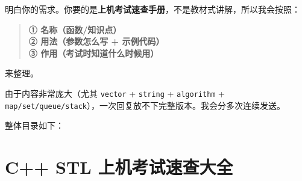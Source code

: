 \documentclass[9pt,twocolumn]{extarticle}
\begin{document}
\setcounter{page}{1}  %
\setcounter{tocdepth}{2} %

\tableofcontents %

\clearpage %

\setcounter{page}{1}   %


明白你的需求。你要的是\textbf{上机考试速查手册}，不是教材式讲解，所以我会按照：

\begin{quote}
\textbf{① 名称（函数/知识点） \\
② 用法（参数怎么写 + 示例代码） \\
③ 作用（考试时知道什么时候用）}
\end{quote}

来整理。

由于内容非常庞大（尤其 \texttt{vector} + \texttt{string} + \texttt{algorithm} + \texttt{map/set/queue/stack}），一次回复放不下完整版本。我会分多次连续发送。

整体目录如下：

\section*{C++ STL 上机考试速查大全}
\end{document}
